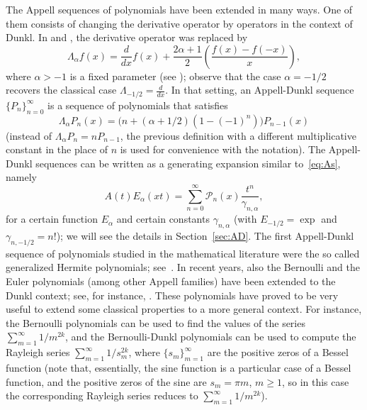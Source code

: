 \documentclass[a4paper]{amsart}
\newcommand{\cc}{\gamma}
\newcommand{\calP}{\mathcal{P}}
\newcommand{\La}{\Lambda_{\alpha}}
\theoremstyle{plain}
\theoremstyle{definition}
\theoremstyle{remark}
\numberwithin{equation}{section}
\begin{document}
The Appell sequences of polynomials have been extended in many ways. One of them consists of changing the derivative operator by operators in the context of Dunkl. In \cite{DH} and \cite{CDPV}, the derivative operator was replaced by 
\begin{equation*}
  \La f(x) = \frac{d}{dx}f(x) + \frac{2\alpha+1}{2}
  \left(\frac{f(x)-f(-x)}{x}\right),
\end{equation*}
where $\alpha > -1$ is a fixed parameter (see \cite{Du, Ros}); observe that the case $\alpha=-1/2$ recovers the classical case $\Lambda_{-1/2} = \frac{d}{dx}$. In that setting, an Appell-Dunkl sequence $\{P_n\}_{n=0}^{\infty}$ is
a sequence of polynomials that satisfies
\begin{equation*}
  \La P_n(x) = \big(n+(\alpha+1/2)(1-(-1)^n)\big)P_{n-1}(x)
\end{equation*}
(instead of $\La P_n = n P_{n-1}$, the previous definition with 
a different multiplicative constant in the place of $n$ is used for 
convenience with the notation). 
The Appell-Dunkl sequences can be written as a generating expansion similar to~\eqref{eq:As}, namely
\begin{equation*}
  A(t) E_\alpha(xt) = \sum_{n=0}^{\infty} \calP_n(x) \frac{t^n}{\cc_{n,\alpha}},
\end{equation*}
for a certain function $E_\alpha$ and certain constants $\cc_{n,\alpha}$ (with $E_{-1/2} = \exp$ and $\cc_{n,-1/2}=n!$); we will see the details in Section~\ref{sec:AD}. The first Appell-Dunkl sequence of polynomials studied in the mathematical literature were the so called generalized Hermite polynomials; see~\cite{Ros}. In recent years, also the Bernoulli and the Euler polynomials (among other Appell families) have been extended to the Dunkl context; see, for instance, \cite{CDPV, CMV, DPV}. These polynomials have proved to be very useful to extend some classical properties to a more general context. For instance, the Bernoulli polynomials can be used to find the values of the series $\sum_{m=1}^{\infty} 1/m^{2k}$, and the Bernoulli-Dunkl polynomials can be used to compute the Rayleigh series $\sum_{m=1}^{\infty} 1/s_m^{2k}$, where $\{s_m\}_{m=1}^\infty$ are the positive zeros of a Bessel function (note that, essentially, the sine function is a particular case of a Bessel function, and the positive zeros of the sine are $s_m = \pi m$, $m \ge 1$, so in this case the corresponding Rayleigh series reduces to $\sum_{m=1}^{\infty} 1/m^{2k}$).
\end{document}
